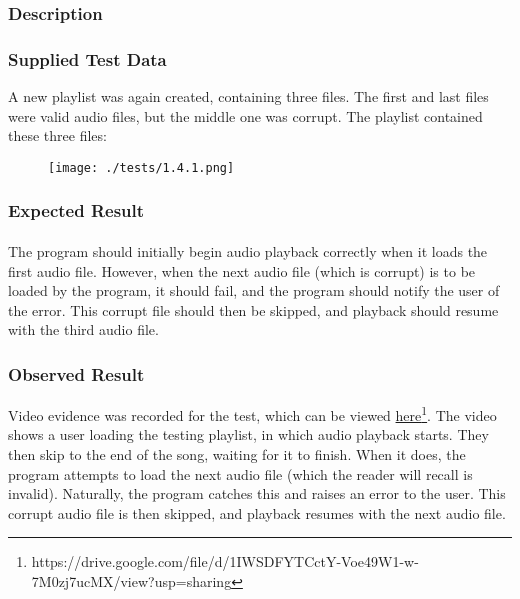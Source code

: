 \subsubsection*{Description}
\paragraph{}
{
	\centering
}

\subsubsection*{Supplied Test Data}
A new playlist was again created, containing three files. The first and last files were valid audio files, but the middle one was corrupt. The playlist contained these three files:
\begin{figure}[H]
	\texttt{[image: ./tests/1.4.1.png]}
\end{figure}

\subsubsection*{Expected Result}
\paragraph{}
The program should initially begin audio playback correctly when it loads the first audio file. However, when the next audio file (which is corrupt) is to be loaded by the program, it should fail, and the program should notify the user of the error. This corrupt file should then be skipped, and playback should resume with the third audio file.

\subsubsection*{Observed Result}
\label{sec:evidence1.4}
Video evidence was recorded for the test, which can be viewed \href{https://drive.google.com/file/d/1IWSDFYTCctY-Voe49W1-w-7M0zj7ucMX/view?usp=sharing}{here}\footnote{
	https://drive.google.com/file/d/1IWSDFYTCctY-Voe49W1-w-7M0zj7ucMX/view?usp=sharing
}.  The video shows a user loading the testing playlist, in which audio playback starts. They then skip to the end of the song, waiting for it to finish. When it does, the program attempts to load the next audio file (which the reader will recall is invalid). Naturally, the program catches this and raises an error to the user. This corrupt audio file is then skipped, and playback resumes with the next audio file.

